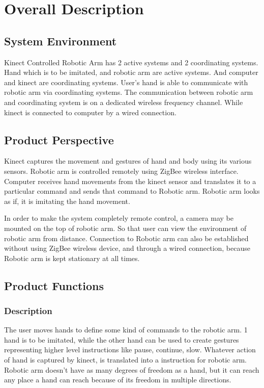 \documentclass[a4wide]{scrreprt}
\begin{document}
\chapter{Overall Description}
\section{System Environment}
Kinect Controlled Robotic Arm has 2 active systems and 2 coordinating systems. Hand which is to be imitated, and robotic arm are active systems. And computer and kinect are coordinating systems. User's hand is able to communicate with robotic arm via coordinating systems. The communication between robotic arm and coordinating system is on a dedicated wireless frequency channel. While kinect is connected to computer by a wired connection.

\section{Product Perspective}
Kinect captures the movement and gestures of hand and body using its various sensors. Robotic arm is controlled remotely using ZigBee wireless interface. Computer receives hand movements from the kinect sensor and translates it to a particular command and sends that command to Robotic arm. Robotic arm looks as if, it is imitating the hand movement. 

In order to make the system completely remote control, a camera may be mounted on the top of robotic arm. So that user can view the environment of robotic arm from distance. Connection to Robotic arm can also be established without using ZigBee wireless device, and through a wired connection, because Robotic arm is kept stationary at all times.

\section{Product Functions}

\subsection{Description}

The user moves hands to define some kind of commands to the robotic arm. 1 hand is to be imitated, while the other hand can be used to create gestures representing higher level instructions like pause, continue, slow. Whatever action of hand is captured by kinect, is translated into a instruction for robotic arm. Robotic arm doesn't have as many degrees of freedom as a hand, but it can reach any place a hand can reach because of its freedom in multiple directions. 
\end{document}
